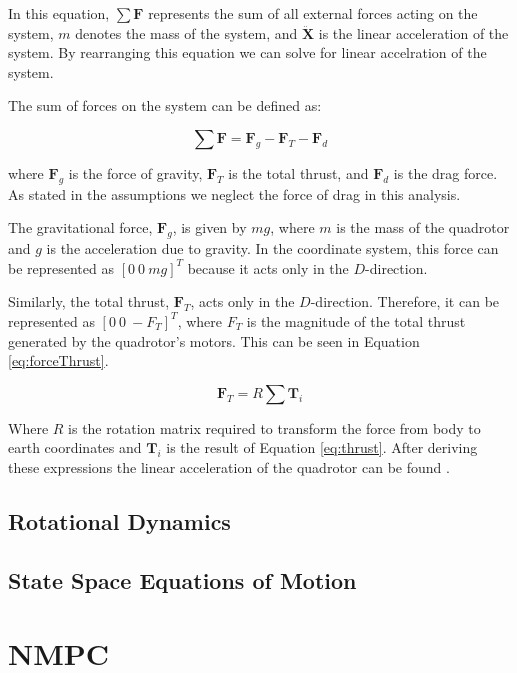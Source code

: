 \documentclass{UoNMCHA}
\numberwithin{equation}{section}
\begin{document}
In this equation, \(\sum \mathbf{F}\) represents the sum of all external forces acting on the system, \(m\) denotes the mass of the system, and \(\mathbf{\ddot{X}}\) is the linear acceleration of the system. By rearranging this equation we can solve for linear accelration of the system.

The sum of forces on the system can be defined as:

\begin{equation}
\sum \mathbf{F} = \mathbf{F}_g - \mathbf{F}_T - \mathbf{F}_d
\label{eq:sum_of_forces}
\end{equation}

where \(\mathbf{F}_g\) is the force of gravity, \(\mathbf{F}_T\) is the total thrust, and \(\mathbf{F}_d\) is the drag force. As stated in the assumptions we neglect the force of drag in this analysis.

The gravitational force, \(\mathbf{F}_g\), is given by \(mg\), where \(m\) is the mass of the quadrotor and \(g\) is the acceleration due to gravity. In the coordinate system, this force can be represented as \([0 \ 0 \ mg]^T\) because it acts only in the \(D\)-direction.

Similarly, the total thrust, \(\mathbf{F}_T\), acts only in the \(D\)-direction. Therefore, it can be represented as \([0 \ 0 \ -F_T]^T\), where \(F_T\) is the magnitude of the total thrust generated by the quadrotor's motors. This can be seen in Equation \ref{eq:forceThrust}.


\begin{equation}
    \mathbf{F}_T = R \sum \mathbf{T}_i
    \label{eq:forceThrust}
    \end{equation}

Where \( R \) is the rotation matrix required to transform the force from body to earth coordinates and \( \mathbf{T}_i \) is the result of Equation \ref{eq:thrust}.
After deriving these expressions the linear acceleration of the quadrotor can be found \cite{website:Quadrotorsystemmodeling}.

\subsection{Rotational Dynamics}
\subsection{State Space Equations of Motion}

\section{NMPC}
\end{document}

